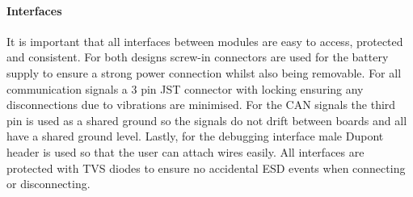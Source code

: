 \paragraph{Interfaces}
It is important that all interfaces between modules are easy to access, protected and consistent. For both designs screw-in connectors are used for the battery supply to ensure a strong power connection whilst also being removable. For all communication signals a 3 pin JST connector with locking ensuring any disconnections due to vibrations are minimised. For the \gls{CAN} signals the third pin is used as a shared ground so the signals do not drift between boards and all have a shared ground level. Lastly, for the debugging interface male Dupont header is used so that the user can attach wires easily. All interfaces are protected with \gls{TVS} diodes to ensure no accidental \gls{ESD} events when connecting or disconnecting.


\begin{comment}
\subsubsection{Component Placement}\label{sub_sub_section:tgt_component_placement}

\paragraph{Thermal Considerations}
Heat dissipating elements, typically diodes and resistors, can cause damage to electronic component, therefore, heat sinks or controlled airflows are sometimes required. This consideration is why on my devices Buck Converters of above 90\% are used instead of the less efficient \gls{LDO} which would have an efficiency of 66\% when converting from 5V to 3.3V. This, in addition to the low power draws of all other components, means that no explicit thermal management is needed.
\end{comment}